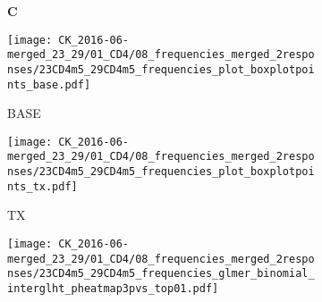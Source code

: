 \documentclass[a4paper, 12pt]{article}
\begin{document}
\begin{figure}[!thb]
\centering

    \caption{Frequencies CD4}
    \begin{subfigure}[t]{0.02\textwidth}
    \vskip 0pt
        \textbf{\textsf{\normalsize C}}
    \end{subfigure}
    \begin{subfigure}[t]{0.45\textwidth}
    \vskip 0pt
    \caption{BASE}
        \texttt{[image: CK\_2016-06-merged\_23\_29/01\_CD4/08\_frequencies\_merged\_2responses/23CD4m5\_29CD4m5\_frequencies\_plot\_boxplotpoints\_base.pdf]}
    \end{subfigure}
    \quad
    \begin{subfigure}[t]{0.02\textwidth}
    \vskip 0pt
        \textbf{\textsf{\normalsize }}
    \end{subfigure}
    \begin{subfigure}[t]{0.45\textwidth}
    \vskip 0pt
    \caption{TX}
        \texttt{[image: CK\_2016-06-merged\_23\_29/01\_CD4/08\_frequencies\_merged\_2responses/23CD4m5\_29CD4m5\_frequencies\_plot\_boxplotpoints\_tx.pdf]}
    \end{subfigure}

    \begin{subfigure}[t]{0.02\textwidth}
    \vskip 0pt
        \textbf{\textsf{\normalsize }}
    \end{subfigure}
    \begin{subfigure}[t]{0.5\textwidth}
    \vskip 0pt
    \caption{}
        \texttt{[image: CK\_2016-06-merged\_23\_29/01\_CD4/08\_frequencies\_merged\_2responses/23CD4m5\_29CD4m5\_frequencies\_glmer\_binomial\_interglht\_pheatmap3pvs\_top01.pdf]}
    \end{subfigure}


\end{figure}
\end{document}
